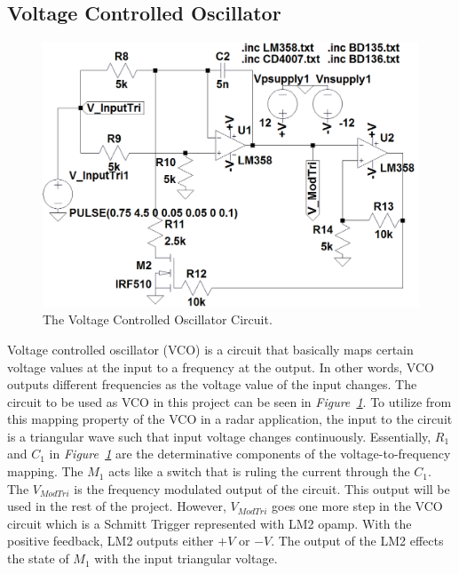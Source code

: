 \documentclass[paper]{IEEEtran}
\begin{document}
\subsection{Voltage Controlled Oscillator}
\begin{figure}[h!]
 \setlength{\unitlength}{\textwidth}
 \center 
 \includegraphics[width=0.45\unitlength]{VCO_Circuit}
 \caption{\label{fig:VCO_Circuit}The Voltage Controlled Oscillator Circuit.}
\end{figure}

Voltage controlled oscillator (VCO) is a circuit that basically maps certain voltage values at the input to a frequency at the output. In other words, VCO outputs different frequencies as the voltage value of the input changes. The circuit to be used as VCO in this project can be seen in \textit{Figure~\ref{fig:VCO_Circuit}}. To utilize from this mapping property of the VCO in a radar application, the input to the circuit is a triangular wave such that input voltage changes continuously. Essentially, $R_{1}$ and $C_{1}$ in \textit{Figure~\ref{fig:VCO_Circuit}} are the determinative components of the voltage-to-frequency mapping. The $M_{1}$ acts like a switch that is ruling the current through the $C_{1}$. The $V_{ModTri}$ is the frequency modulated output of the circuit. This output will be used in the rest of the project. However, $V_{ModTri}$ goes one more step in the VCO circuit which is a Schmitt Trigger represented with LM2 opamp. With the positive feedback, LM2 outputs either $+V$ or $-V$. The output of the LM2 effects the state of $M_{1}$ with the input triangular voltage.
\end{document}
